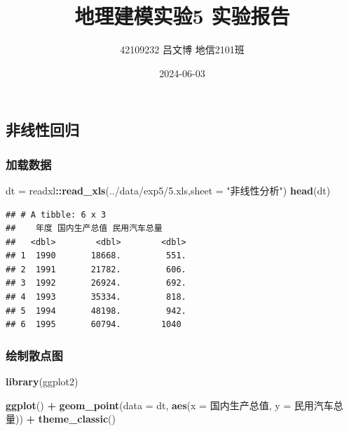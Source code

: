 \documentclass[
]{article}
\title{地理建模实验5 实验报告}
\author{42109232 \quad 吕文博 \quad 地信2101班}
\date{2024-06-03}
\newenvironment{Shaded}{\begin{snugshade}}{\end{snugshade}}
\newcommand{\AttributeTok}[1]{\textcolor[rgb]{0.13,0.29,0.53}{#1}}
\newcommand{\FunctionTok}[1]{\textcolor[rgb]{0.13,0.29,0.53}{\textbf{#1}}}
\newcommand{\NormalTok}[1]{#1}
\newcommand{\OtherTok}[1]{\textcolor[rgb]{0.56,0.35,0.01}{#1}}
\newcommand{\SpecialCharTok}[1]{\textcolor[rgb]{0.81,0.36,0.00}{\textbf{#1}}}
\newcommand{\StringTok}[1]{\textcolor[rgb]{0.31,0.60,0.02}{#1}}
\begin{document}
\maketitle

\subsection{非线性回归}\label{ux975eux7ebfux6027ux56deux5f52}

\subsubsection{加载数据}\label{ux52a0ux8f7dux6570ux636e}

\begin{Shaded}
\begin{Highlighting}[]
\NormalTok{dt }\OtherTok{=}\NormalTok{ readxl}\SpecialCharTok{::}\FunctionTok{read\_xls}\NormalTok{(}\StringTok{\textquotesingle{}../data/exp5/5.xls\textquotesingle{}}\NormalTok{,}\AttributeTok{sheet =} \StringTok{"非线性分析"}\NormalTok{)}
\FunctionTok{head}\NormalTok{(dt)}
\end{Highlighting}
\end{Shaded}

\begin{verbatim}
## # A tibble: 6 x 3
##    年度 国内生产总值 民用汽车总量
##   <dbl>        <dbl>        <dbl>
## 1  1990       18668.         551.
## 2  1991       21782.         606.
## 3  1992       26924.         692.
## 4  1993       35334.         818.
## 5  1994       48198.         942.
## 6  1995       60794.        1040
\end{verbatim}

\subsubsection{绘制散点图}\label{ux7ed8ux5236ux6563ux70b9ux56fe}

\begin{Shaded}
\begin{Highlighting}[]
\FunctionTok{library}\NormalTok{(ggplot2)}

\FunctionTok{ggplot}\NormalTok{() }\SpecialCharTok{+}
  \FunctionTok{geom\_point}\NormalTok{(}\AttributeTok{data =}\NormalTok{ dt,}
             \FunctionTok{aes}\NormalTok{(}\AttributeTok{x =}\NormalTok{ 国内生产总值,}
                 \AttributeTok{y =}\NormalTok{ 民用汽车总量)) }\SpecialCharTok{+}
  \FunctionTok{theme\_classic}\NormalTok{()}
\end{Highlighting}
\end{Shaded}
\end{document}
